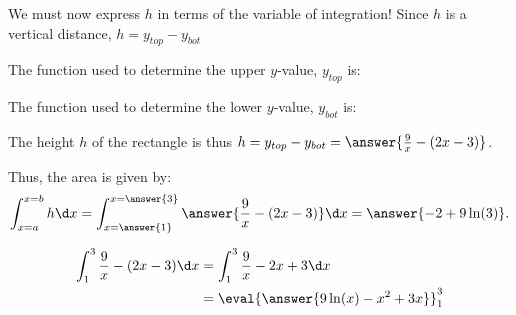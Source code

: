 \documentclass{ximera}
\begin{document}
\begin{example}
We must now express $h$ in terms of the variable of integration!  Since $h$ is a vertical distance, $h=y_{top}-y_{bot}$

The function used to determine the upper $y$-value, $y_{top}$ is:
\begin{multipleChoice}
\end{multipleChoice}

The function used to determine the lower $y$-value, $y_{bot}$ is:
\begin{multipleChoice}
\end{multipleChoice}

The height $h$ of the rectangle is thus $h=y_{top}-y_{bot} = \answer{\frac{9}{x}-(2x-3)}$.

Thus, the area is given by:
  \[
 \int_{x=a}^{x=b} h \d x =  \int_{x=\answer{1}}^{x=\answer{3}} \answer{\frac{9}{x}-(2x-3)} \d x = \answer{-2+9 \ln(3)}.
  \]
  \begin{hint}
    \begin{align*}
      \int_1^3 \frac{9}{x}-(2x-3) \d x &= \int_1^3 \frac{9}{x}-2x+3 \d x\\
      &=\eval{\answer{9\ln(x)-x^2+3x}}_1^3\\
    \end{align*}
  \end{hint}

\end{example}
\end{document}
